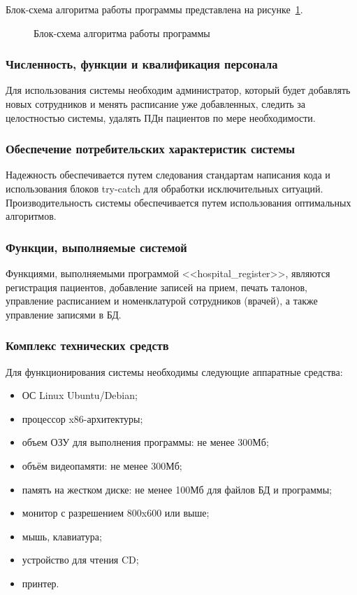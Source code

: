 Блок-схема алгоритма работы программы представлена на рисунке~\ref{block:block}.

\begin{figure}[h!]
\caption{Блок-схема алгоритма работы программы}
\label{block:block}
\end{figure}

\subsubsection{Численность, функции и квалификация персонала}

Для использования системы необходим администратор, который будет добавлять новых сотрудников и менять расписание уже добавленных, следить за целостностью системы, удалять ПДн пациентов по мере необходимости.

\subsubsection{Обеспечение потребительских характеристик системы}

Надежность обеспечивается путем следования стандартам написания кода и использования блоков try-catch для обработки исключительных ситуаций.
Производительность системы обеспечивается путем использования оптимальных алгоритмов.

\subsubsection{Функции, выполняемые системой}

Функциями, выполняемыми программой <<hospital\_register>>, являются регистрация пациентов, добавление записей на прием, печать талонов, управление расписанием и номенклатурой сотрудников (врачей), а также управление записями в БД. 

\subsubsection{Комплекс технических средств}

Для функционирования системы необходимы следующие аппаратные средства:

\begin{itemize}
  \item ОС Linux Ubuntu/Debian;
  \item процессор x86-архитектуры;
  \item объем ОЗУ для выполнения программы: не менее 300Мб;
  \item объём видеопамяти: не менее 300Мб;
  \item память на жестком диске: не менее 100Мб для файлов БД и программы;
  \item монитор с разрешением 800x600 или выше;
  \item мышь, клавиатура;
  \item устройство для чтения CD;
  \item принтер.
\end{itemize}

